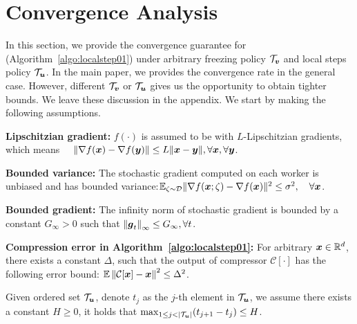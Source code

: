 \section{Convergence Analysis}
\label{sec:theory}
In this section, we provide the convergence guarantee for %
{\myalgo} (Algorithm~\ref{algo:localstep01}) under arbitrary freezing policy $\mathcal{T}_{\boldsymbol{v}}$ and local steps policy $\mathcal{T}_{\boldsymbol{u}}$. In the main paper, we provides the convergence rate in the general case. However, different $\mathcal{T}_{\boldsymbol{v}}$ or $\mathcal{T}_{\boldsymbol{u}}$ gives us the opportunity to obtain tighter bounds. We leave these discussion in the appendix.
We start by making the following assumptions.

\begin{assumption}
\label{assum:smooth}
\textbf{Lipschitzian gradient:} $f(\cdot)$ is assumed to be  with $L$-Lipschitzian gradients, which means $\quad \|\nabla f(\boldsymbol{x}) - \nabla f(\boldsymbol{y}) \| \leq L \|\boldsymbol{x} - \boldsymbol{y} \|, \forall \boldsymbol{x},\forall \boldsymbol{y}$.
\end{assumption}

\begin{assumption}
\label{assume:variance}
\textbf{Bounded variance:}
The stochastic gradient computed on each worker is unbiased and has bounded variance:$\mathbb E_{\zeta\sim\mathcal{D}}\|\nabla f(\boldsymbol{x};\zeta) - \nabla f(\boldsymbol{x})\|^2 \leq \sigma^2,\quad\forall \boldsymbol{x}$.
\end{assumption}

\begin{assumption}
\label{assume:g_bound}
\textbf{Bounded gradient:}
    The infinity norm of stochastic gradient is bounded by a constant $G_\infty>0$ such that $\left\| \boldsymbol{g}_t\right\|_\infty \leq G_\infty, \forall t$.
\end{assumption}

\begin{assumption}
\label{assume:local:compression}
\textbf{Compression error in Algorithm~\ref{algo:localstep01}:} For arbitrary $\boldsymbol{x}\in\mathbb{R}^d$, there exists a constant $\Delta$, such that the output of compressor $\mathcal{C}[\cdot]$ has the following error bound: $\mathbb{E}\left\| \mathcal{C}[\boldsymbol{x}] - \boldsymbol{x} \right\|^2 \leq \Delta^2$.
\end{assumption}

\begin{assumption}
\label{assume:localstep_bound}
Given ordered set $\mathcal{T}_{\boldsymbol{u}}$, denote $t_j$ as the $j$-th element in $\mathcal{T}_{\boldsymbol{u}}$, we assume there exists a constant $H\geq 0$, it holds that $\max_{1\leq j<|\mathcal{T}_{\*u}|}(t_{j+1} - t_j)\leq H$.
\end{assumption}

